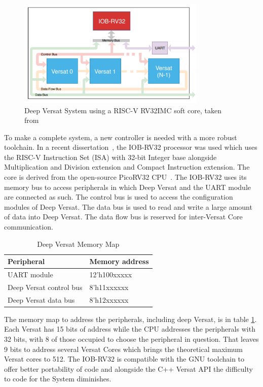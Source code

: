 \begin{figure}[!htbp]
    \centering
    \includegraphics[width=0.8\textwidth]{Figures/deep-Versat-top.png}
    \caption{Deep Versat System using a RISC-V RV32IMC soft core, taken from~\cite{valter:deepversat}}
    \label{figure:deepversattop}
\end{figure} 

\quad To make a complete system, a new controller is needed with a more robust toolchain.
In a recent dissertation~\cite{valter:deepversat}, the IOB-RV32 processor was used which uses the RISC-V Instruction Set (ISA) with 32-bit Integer base alongside Multiplication and Division extension and Compact Instruction extension.
 The core is derived from
the open-source PicoRV32 CPU~\cite{picorv}.
The IOB-RV32 uses its memory bus to access peripherals in which Deep Versat and the UART module are connected as such.
The control bus is used to access the configuration modules of Deep Versat. The data bus is used to read and write
a large amount of data into Deep Versat. The data flow bus is reserved for inter-Versat Core communication.

\begin{table}[!htbp]
    \centering
    \begin{tabular}{|ll|}
        \hline
        \textbf{Peripheral}     & \textbf{Memory address} \\ \hline
        UART module             & 12’h100xxxxx            \\ \hline
        Deep Versat control bus & 8’h11xxxxxx             \\ \hline
        Deep Versat data bus    & 8’h12xxxxxx             \\ \hline
        \end{tabular}
    \caption{Deep Versat Memory Map}
    \label{table:deepversat}
    \end{table}


The memory map to address the peripherals,
 including deep Versat, is in table \ref{table:deepversat}.
 Each Versat has 15 bits of address while the CPU addresses
 the peripherals with 32 bits, with 8 of those occupied to choose
 the peripheral in question. That leaves 9 bits to address several Versat Cores
 which brings the theoretical maximum Versat cores to 512. The IOB-RV32 is compatible with the
 GNU toolchain to offer better portability of code and alongside the C++ Versat API the difficulty
 to code for the System diminishes.